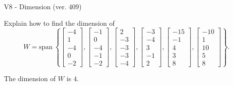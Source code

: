 \begin{exercise}
  \begin{exerciseTitle}V8 - Dimension (ver. 409)\end{exerciseTitle}
  \begin{exerciseStatement}
    Explain how to find the dimension of 
\[W=\mathrm{span}\ \left\{\left[\begin{array}{r}
-4 \\
1 \\
-4 \\
0 \\
-2
\end{array}\right] , \left[\begin{array}{r}
-1 \\
0 \\
-4 \\
-1 \\
-2
\end{array}\right] , \left[\begin{array}{r}
2 \\
-3 \\
-3 \\
-3 \\
-4
\end{array}\right] , \left[\begin{array}{r}
-3 \\
-4 \\
3 \\
-1 \\
2
\end{array}\right] , \left[\begin{array}{r}
-15 \\
-1 \\
4 \\
3 \\
8
\end{array}\right] , \left[\begin{array}{r}
-10 \\
1 \\
10 \\
5 \\
8
\end{array}\right]\right\}.\]



  \end{exerciseStatement}
  \begin{exerciseAnswer}
   The dimension of \(W\) is  \(4\).
  


  \end{exerciseAnswer}
\end{exercise}